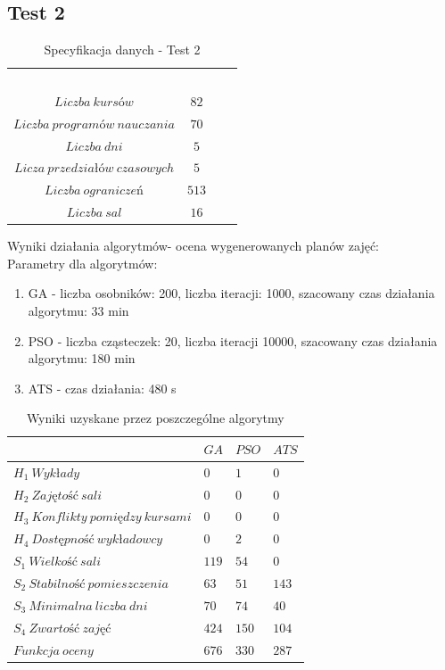 \subsection{Test 2}
\begin{table}[H]
\begin{center}

\begin{tabular}{ |c|c|c|c| }
\multicolumn{1}{r}{}
 &  \multicolumn{1}{c}{$$}
 & \multicolumn{1}{c}{$$} 
 \\
\cline{1-2}
$Liczba\ kursów$ & $82$\\
\cline{1-2}
$Liczba\ programów\ nauczania$ & $70$\\
\cline{1-2}
$Liczba\ dni$ & $5$ \\
\cline{1-2}
$Licza\ przedziałów\ czasowych$ & $5$ \\
\cline{1-2}
$Liczba\ ograniczeń$ & $513$ \\
\cline{1-2}
$Liczba\ sal$ & $16$ \\
\cline{1-2}
\end{tabular}
\end{center}
\caption {Specyfikacja danych - Test 2}
\end{table}
\par Wyniki działania algorytmów- ocena wygenerowanych planów zajęć: \\
Parametry dla algorytmów:
\begin{enumerate}
\item GA - liczba osobników: 200, liczba iteracji: 1000, szacowany czas działania algorytmu: 33 min
\item PSO - liczba cząsteczek: 20, liczba iteracji 10000, szacowany czas działania algorytmu: 180 min
\item ATS - czas działania: 480 s
\end{enumerate}
\begin{table}[H]
\begin{center}

\begin{tabular}{ |l|l|l|l| }
\hline
 & $GA$ & $PSO$ & $ATS$\\
\hline
${H}_{1}\ Wykłady$ & $0$ & $1$ & $0$\\
\hline
$H_{2}\ Zajętość\ sali$ & $0$ & $0$ & $0$\\
\hline
$H_{3}\ Konflikty\ pomiędzy\ kursami$ & $0$ & $0$ & $0$ \\
\hline
$H_{4}\ Dostępność\ wykładowcy$ & $0$ & $2$ & $0$ \\
\hline
$S_{1}\ Wielkość\ sali$ & $119$ & $54$ & $0$ \\
\hline
$S_{2}\ Stabilność\ pomieszczenia$ & $63$ & $51$ & $143$ \\
\hline
$S_{3}\ Minimalna\ liczba\ dni$ & $70$ & $74$ & $40$ \\
\hline
$S_{4}\ Zwartość\ zajęć$ & $424$ & $150$ & $104$ \\
\hline
$Funkcja\ oceny$ & $676$ & $330$ & $287$ \\
\hline
\end{tabular}
\end{center}
\caption {Wyniki uzyskane przez poszczególne algorytmy}
\end{table}
